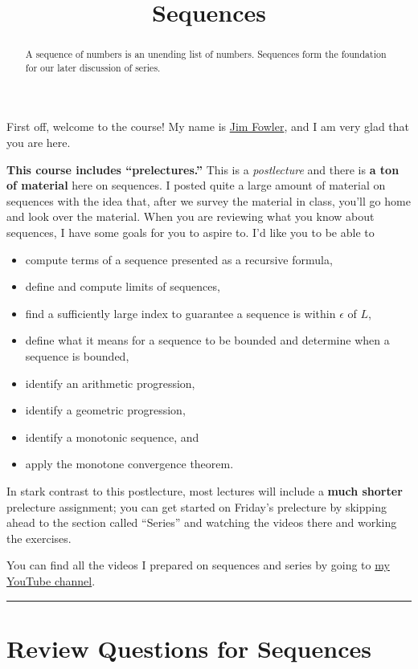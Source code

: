 \documentclass{ximera}
\title{Sequences}
\begin{document}
\begin{abstract}
  A sequence of numbers is an unending list of numbers.  Sequences form the foundation for our later discussion of series.
\end{abstract}

\maketitle

First off, welcome to the course!  My name is \href{http://kisonecat.com/}{Jim Fowler}, and I am very glad that you are here.

\textbf{This course includes ``prelectures.''}  This is a \textit{postlecture} and there is \textbf{a ton
  of material} here on sequences.  I posted quite a large amount of
material on sequences with the idea that, after we survey the material
in class, you'll go home and look over the material.  When you
are reviewing what you know about sequences, I have some goals for you
to aspire to.  I'd like you to be able to
\begin{itemize}
\item compute terms of a sequence presented as a recursive formula,
\item define and compute limits of sequences,
\item find a sufficiently large index to guarantee a sequence is within \(\epsilon\) of \(L\),
\item define what it means for a sequence to be bounded and determine when a sequence is bounded,
\item identify an arithmetic progression,
\item identify a geometric progression,
\item identify a monotonic sequence, and
\item apply the monotone convergence theorem.
\end{itemize}
In stark contrast to this postlecture, most lectures will include a
\textbf{much shorter} prelecture assignment; you can get started on
Friday's prelecture by skipping ahead to the section called ``Series''
and watching the videos there and working the exercises.

You can find all the videos I prepared on sequences and series by going to \href{https://www.youtube.com/playlist?list=PLjOkVtsM_edJgB9yG6fRb5VXsoSxQN0L5}{my YouTube channel}.

\hrule

\section{Review Questions for Sequences}
\end{document}
